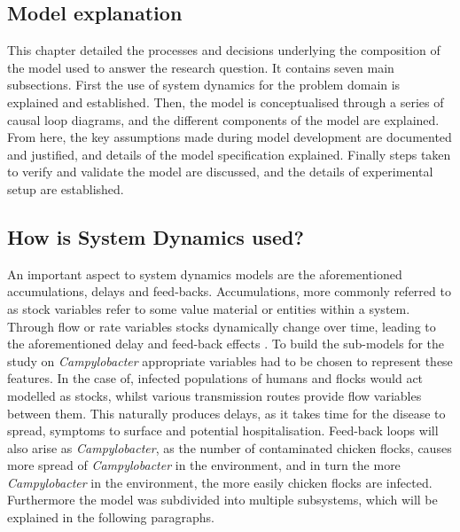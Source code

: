 \subsection{Model explanation}
This chapter detailed the processes and decisions underlying the composition of the model used to answer the research question. It contains seven main subsections. First the use of system dynamics for the problem domain is explained and established. Then, the model is conceptualised through a series of causal loop diagrams, and the different components of the model are explained. From here, the key assumptions made during model development are documented and justified, and details of the model specification explained. Finally steps taken to verify and validate the model are discussed, and the details of experimental setup are established.
\subsection{How is System Dynamics used?}
An important aspect to system dynamics models are the aforementioned accumulations, delays and feed-backs. Accumulations, more commonly referred to as stock variables refer to some value material or entities within a system. Through flow or rate variables stocks dynamically change over time, leading to the aforementioned delay and feed-back effects \parencite{sterman_system_2001}. To build the sub-models for the study on \textit{Campylobacter} appropriate variables had to be chosen to represent these features. In the case of, infected populations of humans and flocks would act modelled as stocks, whilst various transmission routes provide flow variables between them. This naturally produces delays, as it takes time for the disease to spread, symptoms to surface and potential hospitalisation. Feed-back loops will also arise as \textit{Campylobacter}, as the number of contaminated chicken flocks, causes more spread of \textit{Campylobacter} in the environment, and in turn the more \textit{Campylobacter} in the environment, the more easily chicken flocks are infected. Furthermore the model was subdivided into multiple subsystems, which will be explained in the following paragraphs. 


